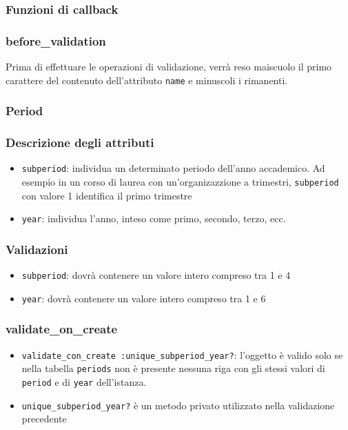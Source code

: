 \documentclass[11pt,a4paper]{article}
\begin{document}
\subsubsection*{Funzioni di callback}
\subsubsection*{before\_validation}
Prima di effettuare le operazioni di validazione, verrà reso maiscuolo il primo carattere del contenuto dell'attributo \verb|name| e minuscoli i rimanenti.
\subsubsection{Period}
\subsubsection*{Descrizione degli attributi}
\begin{itemize}
 \item \verb|subperiod|: individua un determinato periodo dell'anno accademico. Ad esempio in un corso di laurea con un'organizazzione a trimestri, \verb|subperiod| con valore 1 identifica il primo trimestre
 \item \verb|year|: individua l'anno, inteso come primo, secondo, terzo, ecc.
\end{itemize}
\subsubsection*{Validazioni}
\begin{itemize}
 \item \verb|subperiod|: dovrà contenere un valore intero compreso tra 1 e 4
\item \verb|year|: dovrà contenere un valore intero compreso tra 1 e 6
\end{itemize}
\subsubsection*{validate\_on\_create} 
\begin{itemize}
 \item \verb|validate_con_create :unique_subperiod_year?|: l'oggetto è valido solo se nella tabella \verb|periods| non è presente nessuna riga con gli stessi valori di \verb|period| e di \verb|year| dell'istanza.
 \item \verb|unique_subperiod_year?| è un metodo privato utilizzato nella validazione precedente
\end{itemize}
\end{document}
